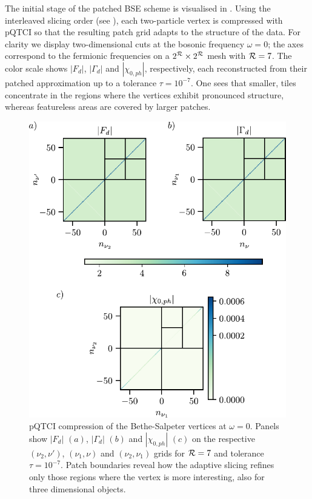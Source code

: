The initial stage of the patched BSE scheme is visualised in .
Using the interleaved slicing order (see
), each two-particle vertex is compressed with pQTCI so that the resulting patch grid adapts to the
structure of the data.
For clarity we display two-dimensional cuts at the bosonic frequency $\omega=0$; the axes correspond to the fermionic frequencies on a $2^{\mathcal{R}}\times2^{\mathcal{R}}$ mesh with $\mathcal{R} = 7$.
The color scale shows $|F_d|$, $|\Gamma_d|$ and $|\chi_{0,ph}|$, respectively, each reconstructed from their patched approximation up to a tolerance $\tau=10^{-7}$. One sees that smaller, tiles concentrate in the regions where the vertices exhibit pronounced structure, whereas featureless areas are covered by larger patches.


\begin{figure}[htpb]
    \centering
    \includegraphics{figures/patchedVertices.pdf}
    \caption{pQTCI compression of the Bethe-Salpeter vertices at $\omega=0$. Panels show $|F_d|$ $(a)$, $|\Gamma_d|$ $(b)$ and $|\chi_{0,ph}|$ $(c)$ on the respective $(\nu_2,\nu')$, $(\nu_1,\nu)$ and $(\nu_2,\nu_1)$ grids for $\mathcal{R}=7$ and tolerance $\tau=10^{-7}$. Patch boundaries reveal how the adaptive slicing refines only those regions where the vertex is more interesting, also for three dimensional objects.}
    \label{fig:patchedVertices}
\end{figure}

